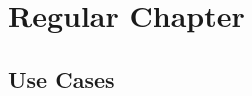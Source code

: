 \documentclass[]{article}
\begin{document}

\newpage

\newpage

\newpage

\newpage


\newpage

\newpage

\chapter{Regular Chapter}
\begin{appendices}
\chapter{Use Cases}

\end{appendices}



\nocite{*}
\end{document}
